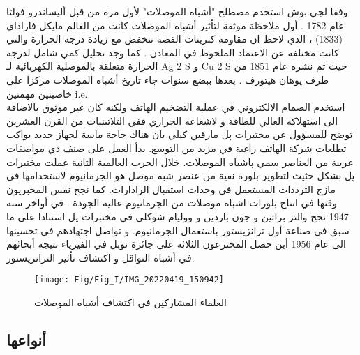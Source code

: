 وفقا لجي.بوش   استخدم مصطلح "أشباه الموصلات" لأول مرة من قبل أليساندرو فولتا عام 1782 .
أول ملاحظة موثقة لتأثير أشباه الموصلات كانت من العالم مايكل فاراداي (1833) ، الذي لاحظ ان مقاومة كبريتات الفضة تنخفض مع زيادة درجة الحرارة  والتي كانت مختلفة عن الاعتماد  الملحوظ في المعادن .
كما وجد تحليل كمي شامل لدرجة الحرارة متعلقة بالموصلية الكهربائية لـ Ag 2 S و Cu 2 S حيث تم نشره عام 1851 من طرف يوهان هيتورف . بعدها ببضع سنوات جاء تاريخ أشباه الموصلات مركزا على خاصيتين مهمتين i.e.\\ \cite{a5}
استخدم الصمام الالكتروني في عملية التضخيم الهاتف ولكنه كان غير موثوق بالاضافة الى استهلاكه العالي للطاقة و لاشعاعه الحراري قفي الثلاثينيات من القرن العشرين توضح للمسؤول عن مختبرات پل مارقين كيلي بان هناك حاجة ماسة لجهاز جديد يواكب تطلعات شركة الهاتف راغبة في مزيد من التوسع. بدأ العمل على صنف ذي مواصفات غريبة من العناصر سمي پاشباه الموصلات. خلال الحرب العالمية الثانية عملت مختبرات پل بشكل حثيث لتطوير بلورة نقية من عنصر شبه موصل هو الجرمانيوم لاستخدامها في مازج الترددات المستعمل في وحدات استقبال الرادارات. كما نجح نفس المخبريون وقتها في انتاج بلورات اشباه موصلات من الجرمانيوم عالية الجودة .
في أواخر سنة 1947 نجح والتر براتين و جون باردين و ووليام شوكلي في مختبرات پل استنادا على ما سبق في صناعة أول ترانزيستور باستعمال الجرمانيوم.
و تواصل اجتهادهم في تحسينها الى عام 1956 أين حصل المخترعون الثلاثة على جائزة نوبل في الفيزياء نتيجة أبحاثهم في أشباه النواقل و اكتشاف تأثير الترانزيستور. \cite{a6}

\begin{figure}[bh]
	\centering
	\texttt{[image: Fig/Fig\_I/IMG\_20220419\_150942]}
	\caption{العلماء المشاركين في اكتشاف أشباه الموصلات}
	\label{fig:img20220419150942}
\end{figure}
\FloatBarrier

\subsection{ أنواعها}

